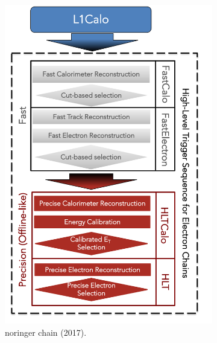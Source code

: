 \begin{figure}[h!tb]
  \begin{center}
  \begin{subfigure}[c]{.48\textwidth}
  \centering
  \includegraphics[width=\textwidth]{sections/context/figures/ElectronChain_Run2_cutbased.pdf}
  \caption{noringer chain (2017).}
  \end{subfigure}
  \hfill
  \begin{subfigure}[c]{.48\textwidth}
  \centering

\end{subfigure}
\end{center}
\end{figure}
